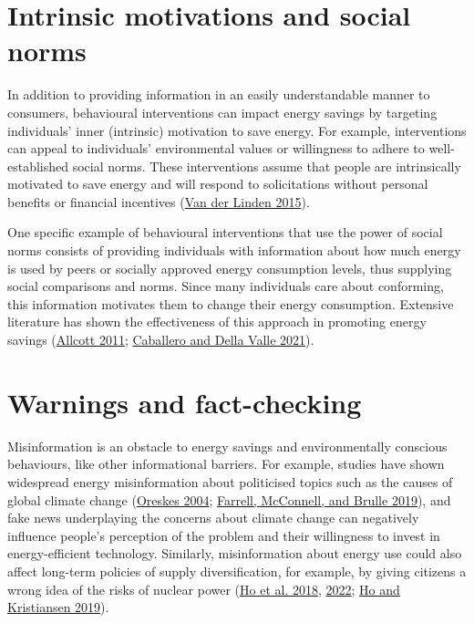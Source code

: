 \documentclass[
  12pt,
  captions=heading]{scrreport}
\begin{document}
\hypertarget{intrinsic-motivations-and-social-norms}{%
\section{Intrinsic motivations and social
norms}\label{intrinsic-motivations-and-social-norms}}

In addition to providing information in an easily understandable manner
to consumers, behavioural interventions can impact energy savings by
targeting individuals' inner (intrinsic) motivation to save energy. For
example, interventions can appeal to individuals' environmental values
or willingness to adhere to well-established social norms. These
interventions assume that people are intrinsically motivated to save
energy and will respond to solicitations without personal benefits or
financial incentives (\protect\hyperlink{ref-van2015social}{Van der
Linden 2015}).

One specific example of behavioural interventions that use the power of
social norms consists of providing individuals with information about
how much energy is used by peers or socially approved energy consumption
levels, thus supplying social comparisons and norms. Since many
individuals care about conforming, this information motivates them to
change their energy consumption. Extensive literature has shown the
effectiveness of this approach in promoting energy savings
(\protect\hyperlink{ref-allcott2011social}{Allcott 2011};
\protect\hyperlink{ref-caballero2021tackling}{Caballero and Della Valle
2021}).

\hypertarget{warnings-and-fact-checking}{%
\section{Warnings and fact-checking}\label{warnings-and-fact-checking}}

Misinformation is an obstacle to energy savings and environmentally
conscious behaviours, like other informational barriers. For example,
studies have shown widespread energy misinformation about politicised
topics such as the causes of global climate change
(\protect\hyperlink{ref-oreskes2004scientific}{Oreskes 2004};
\protect\hyperlink{ref-farrell2019evidence}{Farrell, McConnell, and
Brulle 2019}), and fake news underplaying the concerns about climate
change can negatively influence people's perception of the problem and
their willingness to invest in energy-efficient technology. Similarly,
misinformation about energy use could also affect long-term policies of
supply diversification, for example, by giving citizens a wrong idea of
the risks of nuclear power (\protect\hyperlink{ref-ho2018can}{Ho et al.
2018}, \protect\hyperlink{ref-ho2022fake}{2022};
\protect\hyperlink{ref-ho2019environmental}{Ho and Kristiansen 2019}).
\end{document}
